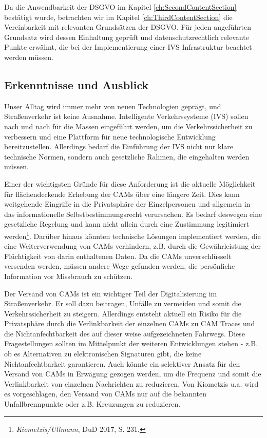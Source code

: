 Da die Anwendbarkeit der DSGVO im Kapitel \ref{ch:SecondContentSection} bestätigt wurde, betrachten wir im Kapitel \ref{ch:ThirdContentSection} die Vereinbarkeit mit relevanten Grundsätzen der DSGVO. Für jeden angeführten Grundsatz wird dessen Einhaltung geprüft und datenschutzrechtlich relevante Punkte erwähnt, die bei der Implementierung einer IVS Infrastruktur beachtet werden müssen.


\subsection{Erkenntnisse und Ausblick}

Unser Alltag wird immer mehr von neuen Technologien geprägt, und Straßenverkehr ist keine Ausnahme. Intelligente Verkehrssysteme (IVS) sollen nach und nach für die Massen eingeführt werden, um die Verkehrssicherheit zu verbessern und eine Plattform für neue technologische Entwicklung bereitzustellen. Allerdings bedarf die Einführung der IVS nicht nur klare technische Normen, sondern auch gesetzliche Rahmen, die eingehalten werden müssen. 

Einer der wichtigsten Gründe für diese Anforderung ist die aktuelle Möglichkeit für flächendeckende Erhebung der CAMs über eine längere Zeit. Dies kann weitgehende Eingriffe in die Privatsphäre der Einzelpersonen und allgemein in das informationelle Selbstbestimmungsrecht verursachen. Es bedarf deswegen eine gesetzliche Regelung und kann nicht allein durch eine Zustimmung legitimiert werden\footnote{\emph{Kiometzis/Ullmann}, DuD 2017, S. 231.}. Darüber hinaus könnten technische Lösungen implementiert werden, die eine Weiterverwendung von CAMs verhindern, z.B. durch die Gewährleistung der Flüchtigkeit von darin enthaltenen Daten. Da die CAMs unverschlüsselt versenden werden, müssen andere Wege gefunden werden, die persönliche Information vor Missbrauch zu schützen.

Der Versand von CAMs ist ein wichtiger Teil der Digitalisierung im Straßenverkehr. Er soll dazu beitragen, Unfälle zu vermeiden und somit die Verkehrssicherheit zu steigern. Allerdings entsteht aktuell ein Risiko für die Privatsphäre durch die Verlinkbarkeit der einzelnen CAMs zu CAM Traces und die Nichtanfechtbarkeit des auf dieser weise aufgezeichneten Fahrwegs. Diese Fragestellungen sollten im Mittelpunkt der weiteren Entwicklungen stehen - z.B. ob es Alternativen zu elektronischen Signaturen gibt, die keine Nichtanfechtbarkeit garantieren. Auch könnte ein selektiver Ansatz für den Versand von CAMs in Erwägung gezogen werden, um die Frequenz und somit die Verlinkbarkeit von einzelnen Nachrichten zu reduzieren. Von Kiometzis u.a. wird es vorgeschlagen, den Versand von CAMs nur auf die bekannten Unfallbrennpunkte oder z.B. Kreuzungen zu reduzieren.

